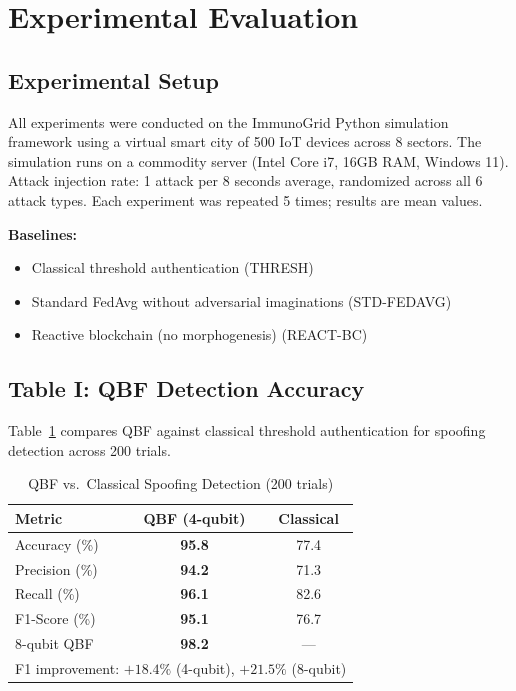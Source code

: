 
\section{Experimental Evaluation}
\label{sec:eval}

\subsection{Experimental Setup}

All experiments were conducted on the ImmunoGrid Python simulation framework
using a virtual smart city of 500 IoT devices across 8 sectors.
The simulation runs on a commodity server (Intel Core i7, 16GB RAM, Windows 11).
Attack injection rate: 1 attack per 8 seconds average, randomized across all
6 attack types. Each experiment was repeated 5 times; results are mean values.

\textbf{Baselines:}
\begin{itemize}
  \item Classical threshold authentication (THRESH)
  \item Standard FedAvg without adversarial imaginations (STD-FEDAVG)
  \item Reactive blockchain (no morphogenesis) (REACT-BC)
\end{itemize}

\subsection{Table I: QBF Detection Accuracy}

Table~\ref{tab:qbf_results} compares QBF against classical threshold authentication
for spoofing detection across 200 trials.

\begin{table}[h]
\caption{QBF vs.\ Classical Spoofing Detection (200 trials)}
\label{tab:qbf_results}
\centering
\begin{tabular}{lcc}
\toprule
\textbf{Metric} & \textbf{QBF (4-qubit)} & \textbf{Classical} \\
\midrule
Accuracy (\%)   & \textbf{95.8} & 77.4 \\
Precision (\%)  & \textbf{94.2} & 71.3 \\
Recall (\%)     & \textbf{96.1} & 82.6 \\
F1-Score (\%)   & \textbf{95.1} & 76.7 \\
\midrule
8-qubit QBF     & \textbf{98.2} & --- \\
\bottomrule
\multicolumn{3}{l}{\small F1 improvement: $+18.4\%$ (4-qubit), $+21.5\%$ (8-qubit)}
\end{tabular}
\end{table}

